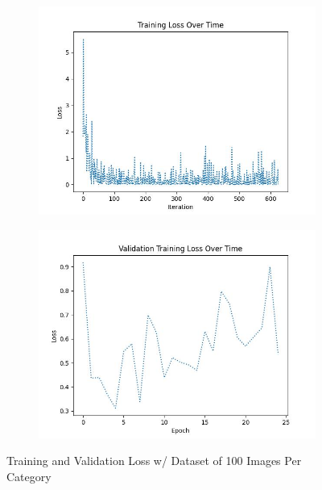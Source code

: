 \documentclass{article}
\begin{document}
\begin{figure}[H]
    \centering
    \begin{subfigure}{0.4\textwidth}
        \centering
        \includegraphics[width = \textwidth]{imgs/loss/loss_plot_100.jpg}
    \end{subfigure}
    \begin{subfigure}{0.4\textwidth}
        \centering
        \includegraphics[width = \textwidth]{imgs/loss/validation_loss_plot_100.jpg}
    \end{subfigure}
    \caption{Training and Validation Loss w/ Dataset of 100 Images Per Category}
\end{figure}
\end{document}
